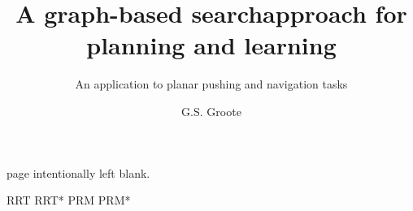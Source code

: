 \documentclass{layout/tudelft-report}
\begin{document}
\frontmatter

\title{A graph-based search\newline approach for planning and learning}

\subtitle{An application to planar pushing and navigation tasks} 

\author{G.S. Groote}
\subject{SC52045: System \& Control Thesis Report}

%
\makecover
page intentionally left blank.
\newpage




\tableofcontents
\listoffigures
\listoftables

\printunsrtglossary[type=symbols,style=long]

\mainmatter

\ac{RRT}
\ac{RRT*}
\ac{PRM}
\ac{PRM*}









\setcounter{biburlnumpenalty}{7000}
\setcounter{biburllcpenalty}{7000}
\setcounter{biburlucpenalty}{7000}

\printbibliography[heading=bibintoc,title=References]


\end{document}
